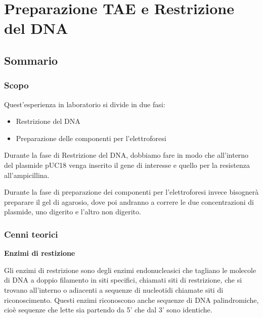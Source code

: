 \section{\LARGE{Preparazione TAE e Restrizione del DNA}}

\vspace{0.6cm}


\subsection{Sommario}

\subsubsection{Scopo}

Quest'esperienza in laboratorio si divide in due fasi:

\begin{itemize}

	\item Restrizione del DNA

	\item Preparazione delle componenti per l'elettroforesi

\end{itemize}

Durante la fase di Restrizione del DNA, dobbiamo fare in modo che all'interno del
plasmide pUC18 venga inserito il gene di interesse e quello per la resistenza all'ampicillina.
\vspace{0.3cm}

Durante la fase di preparazione dei componenti per l'elettroforesi invece bisognerà preparare il gel di
agarosio, dove poi andranno a correre le due concentrazioni di plasmide, uno digerito e l'altro non digerito.

\subsubsection{Cenni teorici}

\textbf{Enzimi di restizione}
\vspace{0.3cm}



Gli enzimi di restrizione sono degli enzimi endonucleasici che tagliano le molecole
di DNA a doppio filamento in siti specifici, chiamati siti di restrizione,
che si trovano all'interno o adiacenti a sequenze di nucleotidi chiamate siti di riconoscimento.
Questi enzimi riconoscono anche sequenze di DNA palindromiche, cioè sequenze che lette sia
partendo da 5' che dal 3' sono identiche.

